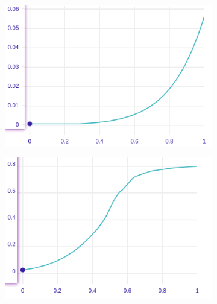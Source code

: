 \documentclass[../main.tex]{subfiles}
\begin{document}
\begin{figure}
    \centering
    \begin{subfigure}[b]{0.48\linewidth}
        \makeatletter{}\makeatother
        \includegraphics[width=\linewidth]{../img/ANN_safety_worst.png}
        \label{fig:ANN-ceteris-paribus-safety}
    \end{subfigure}
    \begin{subfigure}[b]{0.48\linewidth}
        \includegraphics[width=\linewidth]{../img/ANN_safety_mid.png}
    \end{subfigure}


\end{figure}
\end{document}
